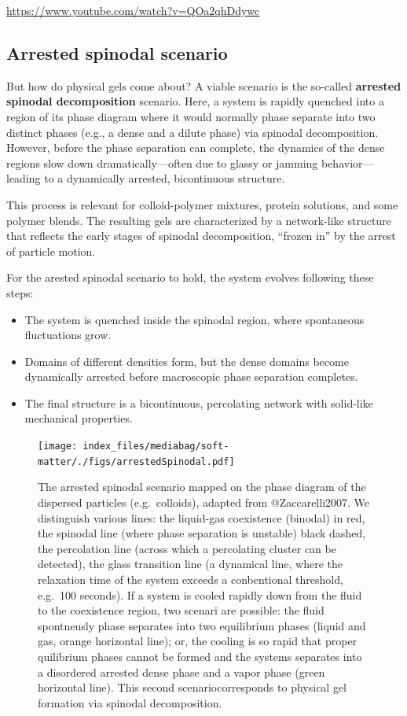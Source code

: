 \documentclass[
  letterpaper,
  enabledeprecatedfontcommands]{report}
\providecommand{\tightlist}{%
  \setlength{\itemsep}{0pt}\setlength{\parskip}{0pt}}
\begin{document}
\url{https://www.youtube.com/watch?v=QOa2qhDdywc}

\subsection{Arrested spinodal
scenario}\label{arrested-spinodal-scenario}

But how do physical gels come about? A viable scenario is the so-called
\textbf{arrested spinodal decomposition} scenario. Here, a system is
rapidly quenched into a region of its phase diagram where it would
normally phase separate into two distinct phases (e.g., a dense and a
dilute phase) via spinodal decomposition. However, before the phase
separation can complete, the dynamics of the dense regions slow down
dramatically---often due to glassy or jamming behavior---leading to a
dynamically arrested, bicontinuous structure.

This process is relevant for colloid-polymer mixtures, protein
solutions, and some polymer blends. The resulting gels are characterized
by a network-like structure that reflects the early stages of spinodal
decomposition, ``frozen in'' by the arrest of particle motion.

For the arested spinodal scenario to hold, the system evolves following
these steps:

\begin{itemize}
\tightlist
\item
  The system is quenched inside the spinodal region, where spontaneous
  fluctuations grow.
\item
  Domains of different densities form, but the dense domains become
  dynamically arrested before macroscopic phase separation completes.
\item
  The final structure is a bicontinuous, percolating network with
  solid-like mechanical properties.
\end{itemize}

\begin{figure}[H]

{\centering \texttt{[image: index\_files/mediabag/soft-matter/./figs/arrestedSpinodal.pdf]}

}

\caption{The arrested spinodal scenario mapped on the phase diagram of
the dispersed particles (e.g.~colloids), adapted from @Zaccarelli2007.
We distinguish various lines: the liquid-gas coexistence (binodal) in
red, the spinodal line (where phase separation is unstable) black
dashed, the percolation line (across which a percolating cluster can be
detected), the glass transition line (a dynamical line, where the
relaxation time of the system exceeds a conbentional threshold, e.g.~100
seconds). If a system is cooled rapidly down from the fluid to the
coexistence region, two scenari are possible: the fluid spontneusly
phase separates into two equilibrium phases (liquid and gas, orange
horizontal line); or, the cooling is so rapid that proper quilibrium
phases cannot be formed and the systems separates into a disordered
arrested dense phase and a vapor phase (green horizontal line). This
second scenariocorresponds to physical gel formation via spinodal
decomposition.}

\end{figure}%
\end{document}

